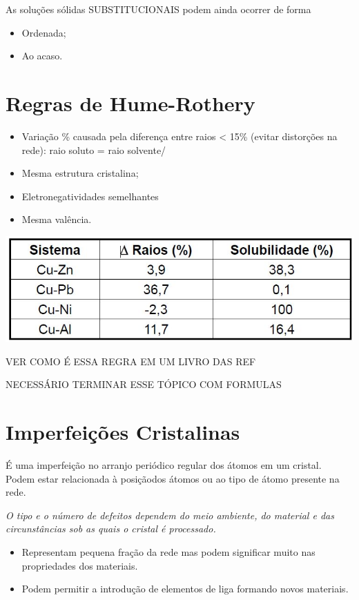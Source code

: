 As soluções sólidas SUBSTITUCIONAIS podem ainda ocorrer de forma 

\begin{itemize}
	\item Ordenada;
	\item Ao acaso.
\end{itemize}

\section{Regras de Hume-Rothery}

\begin{itemize}
	\item Variação \% causada pela diferença entre raios < 15\% (evitar distorções na rede): raio soluto = raio solvente/
	\item Mesma estrutura cristalina;
	\item Eletronegatividades semelhantes
	\item Mesma valência.
\end{itemize}



\includegraphics[scale=0.4,trim={0 0 0 0}]{figures/hume}


{\LARGE VER COMO É ESSA REGRA EM UM LIVRO DAS REF}

{\LARGE NECESSÁRIO TERMINAR ESSE TÓPICO COM FORMULAS}


\section{Imperfeições Cristalinas}

É uma imperfeição no arranjo periódico regular dos átomos em um cristal. Podem estar relacionada à posiçãodos átomos ou ao tipo de átomo presente na rede.

\textit{O tipo e o número de defeitos dependem do meio ambiente, do material e das circunstâncias sob as quais o cristal é processado.}

\begin{itemize}
	\item Representam pequena fração da rede mas podem significar muito nas propriedades dos materiais.
	\item Podem permitir a introdução de elementos de liga formando novos materiais.
\end{itemize}

